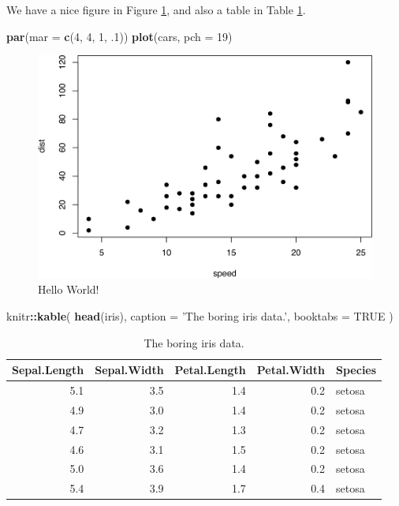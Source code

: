 \documentclass[]{krantz}
\newenvironment{Shaded}{\begin{snugshade}}{\end{snugshade}}
\newcommand{\KeywordTok}[1]{\textcolor[rgb]{0.13,0.29,0.53}{\textbf{#1}}}
\newcommand{\DataTypeTok}[1]{\textcolor[rgb]{0.13,0.29,0.53}{#1}}
\newcommand{\DecValTok}[1]{\textcolor[rgb]{0.00,0.00,0.81}{#1}}
\newcommand{\StringTok}[1]{\textcolor[rgb]{0.31,0.60,0.02}{#1}}
\newcommand{\OtherTok}[1]{\textcolor[rgb]{0.56,0.35,0.01}{#1}}
\newcommand{\OperatorTok}[1]{\textcolor[rgb]{0.81,0.36,0.00}{\textbf{#1}}}
\newcommand{\NormalTok}[1]{#1}
\begin{document}
We have a nice figure in Figure \ref{fig:hello}, and also a table in
Table \ref{tab:iris}.

\begin{Shaded}
\begin{Highlighting}[]
\KeywordTok{par}\NormalTok{(}\DataTypeTok{mar =} \KeywordTok{c}\NormalTok{(}\DecValTok{4}\NormalTok{, }\DecValTok{4}\NormalTok{, }\DecValTok{1}\NormalTok{, .}\DecValTok{1}\NormalTok{))}
\KeywordTok{plot}\NormalTok{(cars, }\DataTypeTok{pch =} \DecValTok{19}\NormalTok{)}
\end{Highlighting}
\end{Shaded}

\begin{figure}
\includegraphics[width=0.9\linewidth]{book_files/figure-latex/hello-1} \caption{Hello World!}\label{fig:hello}
\end{figure}

\begin{Shaded}
\begin{Highlighting}[]
\NormalTok{knitr}\OperatorTok{::}\KeywordTok{kable}\NormalTok{(}
  \KeywordTok{head}\NormalTok{(iris), }\DataTypeTok{caption =} \StringTok{'The boring iris data.'}\NormalTok{,}
  \DataTypeTok{booktabs =} \OtherTok{TRUE}
\NormalTok{)}
\end{Highlighting}
\end{Shaded}

\begin{table}

\caption{\label{tab:iris}The boring iris data.}
\centering
\begin{tabular}[t]{rrrrl}
\toprule
Sepal.Length & Sepal.Width & Petal.Length & Petal.Width & Species\\
\midrule
5.1 & 3.5 & 1.4 & 0.2 & setosa\\
4.9 & 3.0 & 1.4 & 0.2 & setosa\\
4.7 & 3.2 & 1.3 & 0.2 & setosa\\
4.6 & 3.1 & 1.5 & 0.2 & setosa\\
5.0 & 3.6 & 1.4 & 0.2 & setosa\\
5.4 & 3.9 & 1.7 & 0.4 & setosa\\
\bottomrule
\end{tabular}
\end{table}
\end{document}
